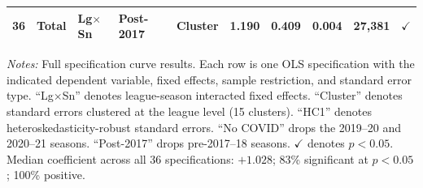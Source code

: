 \begin{table}[htbp]
\begin{threeparttable}
\begin{tabular}{clllllrrrr}
36 & Total & Lg$\times$Sn & Post-2017 & Cluster & 1.190 & 0.409 & 0.004 & 27,381 & $\checkmark$ \\
\bottomrule
\end{tabular}
\begin{tablenotes}[flushleft]
\footnotesize
\item \textit{Notes:} Full specification curve results. Each row is one OLS specification
with the indicated dependent variable, fixed effects, sample restriction, and standard
error type. ``Lg$\times$Sn'' denotes league-season interacted fixed effects.
``Cluster'' denotes standard errors clustered at the league level (15 clusters).
``HC1'' denotes heteroskedasticity-robust standard errors. ``No COVID'' drops the
2019--20 and 2020--21 seasons. ``Post-2017'' drops pre-2017--18 seasons.
$\checkmark$ denotes $p<0.05$. Median coefficient across all 36 specifications:
$+1.028$; 83\% significant at $p<0.05$; 100\% positive.
\end{tablenotes}
\end{threeparttable}
\end{table}


